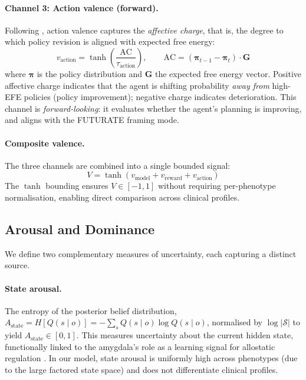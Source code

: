 \documentclass[11pt,a4paper]{article}
\begin{document}
\paragraph{Channel 3: Action valence (forward).}
Following \citet{hesp2021deeply}, action valence captures the \emph{affective charge}, that is, the degree to which policy revision is aligned with expected free energy:
\begin{equation}
    v_{\text{action}} = \tanh\!\left(\frac{\text{AC}}{\tau_{\text{action}}}\right), \qquad \text{AC} = (\boldsymbol{\pi}_{t-1} - \boldsymbol{\pi}_t) \cdot \mathbf{G}
\end{equation}
where $\boldsymbol{\pi}$ is the policy distribution and $\mathbf{G}$ the expected free energy vector. Positive affective charge indicates that the agent is shifting probability \emph{away from} high-EFE policies (policy improvement); negative charge indicates deterioration. This channel is \emph{forward-looking}: it evaluates whether the agent's planning is improving, and aligns with the FUTURATE framing mode.

\paragraph{Composite valence.}
The three channels are combined into a single bounded signal:
\begin{equation}
    V = \tanh(v_{\text{model}} + v_{\text{reward}} + v_{\text{action}})
\end{equation}
The $\tanh$ bounding ensures $V \in [-1, 1]$ without requiring per-phenotype normalisation, enabling direct comparison across clinical profiles.

\subsection{Arousal and Dominance}

We define two complementary measures of uncertainty, each capturing a distinct source.

\paragraph{State arousal.} The entropy of the posterior belief distribution, $A_{\text{state}} = H[Q(s \mid o)] = -\sum_s Q(s \mid o) \log Q(s \mid o)$, normalised by $\log |\mathcal{S}|$ to yield $A_{\text{state}} \in [0, 1]$. This measures uncertainty about the current hidden state, functionally linked to the amygdala's role as a learning signal for allostatic regulation \citep{barrett2017theory}. In our model, state arousal is uniformly high across phenotypes (due to the large factored state space) and does not differentiate clinical profiles.
\end{document}
